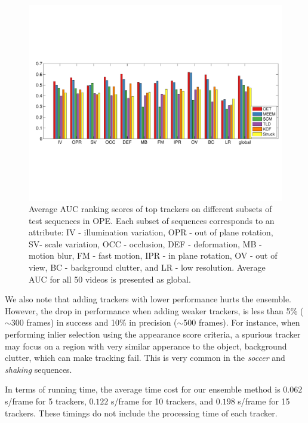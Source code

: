 

\begin{figure}
\centering
\includegraphics[width=1.0\linewidth, trim= 0.2cm 6.15cm 0.2cm 5.8cm, clip=true]{Figures/bar_graph.pdf}
\caption{\small Average AUC ranking scores of top trackers on different subsets of test
		sequences in OPE. Each subset of sequences corresponds to an attribute:
		IV - illumination variation, OPR - out of plane rotation, SV- scale
		variation, OCC - occlusion, DEF - deformation, MB - motion blur, FM -
		fast motion, IPR - in plane rotation, OV - out of view, BC - background
		clutter, and LR - low resolution. Average AUC for all 50 videos is
		presented as global.}
\label{fig:attributes}
\end{figure}


We also note that adding trackers with lower performance hurts the ensemble.
However, the drop in performance when adding
weaker trackers, is less than 5\% ($\sim$300 frames) in success and 10\% in
precision ($\sim$500 frames). For instance, when performing inlier selection using
the
appearance score criteria, a spurious tracker may focus on a region with
very similar apperance to the object, \eg background clutter, which can
make tracking fail.
This is very common in the \textit{soccer} and \textit{shaking}
sequences.

In terms of running time, the average time cost for our ensemble
method is $0.062$ s/frame for 5
trackers, $0.122$ s/frame for 10 trackers, and $0.198$ s/frame for 15 trackers.
These timings do not include the processing time of each tracker.

